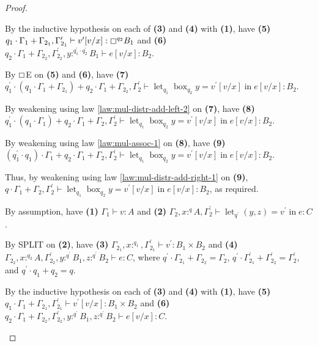 \documentclass[acmsmall,screen,nonacm]{acmart}
\DeclareMathOperator{\llet}{\text{let}}
\DeclareMathOperator{\lin}{\text{in}}
\DeclareMathOperator{\bbox}{\text{box}}
\newcommand{\tee}{\vdash}
\begin{document}
\begin{proof}
\begin{description}
    By the inductive hypothesis on each of \textbf{(3)} and \textbf{(4)} with \textbf{(1)}, have \textbf{(5)} $q_1 \cdot \Gamma_1 + \Gamma_{2_1}, \Gamma_{2_1}^\prime \tee v^\prime[v/x] : \boxempty^{q_2} B_1$ and \textbf{(6)} $q_2 \cdot \Gamma_1 + \Gamma_{2_2}, \Gamma_{2_2}^\prime, y :^{q_1^\prime \cdot q_2^\prime} B_1 \tee e[v/x] : B_2$.

    By $\boxempty$E on \textbf{(5)} and \textbf{(6)}, have \textbf{(7)} $q_1^\prime \cdot (q_1 \cdot \Gamma_1 + \Gamma_{2_1}) + q_2 \cdot \Gamma_1 + \Gamma_{2_2}, \Gamma_2^\prime \tee \llet_{q_1} \bbox_{q_2} y = v^\prime[v/x] \lin e[v/x] : B_2$.
    
    By weakening using law \ref{law:mul-distr-add-left-2} on \textbf{(7)}, have \textbf{(8)} $q_1^\prime \cdot (q_1 \cdot \Gamma_1) + q_2 \cdot \Gamma_1 + \Gamma_2, \Gamma_2^\prime \tee \llet_{q_1} \bbox_{q_2} y = v^\prime[v/x] \lin e[v/x] : B_2$.
    
    By weakening using law \ref{law:mul-assoc-1} on \textbf{(8)}, have \textbf{(9)} 
    $(q_1^\prime \cdot q_1) \cdot \Gamma_1 + q_2 \cdot \Gamma_1 + \Gamma_2, \Gamma_2^\prime \tee \llet_{q_1} \bbox_{q_2} y = v^\prime[v/x] \lin e[v/x] : B_2$.

    Thus, by weakening using law \ref{law:mul-distr-add-right-1} on \textbf{(9)}, $q \cdot \Gamma_1 + \Gamma_2, \Gamma_2^\prime \tee \llet_{q_1} \bbox_{q_2} y = v^\prime[v/x] \lin e[v/x] : B_2$, as required.
    \\
    \item[Case SPLIT.] 
    By assumption, have \textbf{(1)} $\Gamma_1 \tee v : A$ and \textbf{(2)} $\Gamma_2, x :^q A, \Gamma_2^\prime \tee \llet_{q^\prime} (y, z) = v^\prime \lin e : C$.
    
    By SPLIT on \textbf{(2)}, have \textbf{(3)} $\Gamma_{2_1}, x :^{q_1}, \Gamma_{2_1}^\prime \tee v^\prime : B_1 \times B_2$ and \textbf{(4)} $\Gamma_{2_2}, x :^{q_2} A, \Gamma_{2_2}^\prime, y :^{q^\prime} B_1, z :^{q^\prime} B_2 \tee e : C$, where $q^\prime \cdot \Gamma_{2_1} + \Gamma_{2_2} = \Gamma_2$, $q^\prime \cdot \Gamma_{2_1}^\prime + \Gamma_{2_2}^\prime = \Gamma_2^\prime$, and $q^\prime \cdot q_1 + q_2 = q$.
    
    By the inductive hypothesis on each of \textbf{(3)} and \textbf{(4)} with \textbf{(1)}, have \textbf{(5)} $q_1 \cdot \Gamma_1 + \Gamma_{2_1}, \Gamma_{2_1}^\prime \tee v^\prime[v/x] : B_1 \times B_2$ and \textbf{(6)} $q_2 \cdot \Gamma_1 + \Gamma_{2_2}, \Gamma_{2_2}^\prime, y :^{q^\prime} B_1, z :^{q^\prime} B_2 \tee e[v/x] : C$.


\end{description}
\end{proof}
\end{document}
